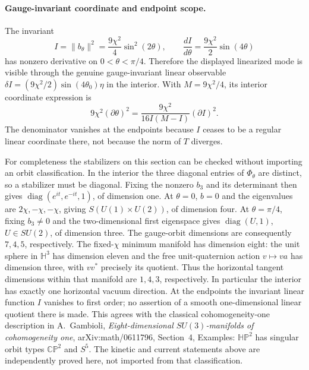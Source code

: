 \paragraph{Gauge-invariant coordinate and endpoint scope.}
The invariant
\[
 I=\|b_\theta\|^2=\frac{9\chi^2}{4}\sin^2(2\theta),\qquad
 \frac{dI}{d\theta}=\frac{9\chi^2}{2}\sin(4\theta)
\]
has nonzero derivative on \(0<\theta<\pi/4\). Therefore the displayed
linearized mode is visible through the genuine gauge-invariant
linear observable
\(\delta I=(9\chi^2/2)\sin(4\theta_0)\eta\) in the interior.
With \(M=9\chi^2/4\), its interior coordinate expression is
\[
 9\chi^2(\partial\theta)^2
       =\frac{9\chi^2}{16I(M-I)}(\partial I)^2 .
\]
The denominator vanishes at the endpoints because \(I\) ceases to be
a regular linear coordinate there, not because the norm of \(T\)
diverges.

For completeness the stabilizers on this section can be checked
without importing an orbit classification. In the interior the
three diagonal entries of \(\Phi_\theta\) are distinct, so a
stabilizer must be diagonal. Fixing the nonzero \(b_3\) and its
determinant then gives
\(\operatorname{diag}(e^{it},e^{-it},1)\), of dimension one.
At \(\theta=0\), \(b=0\) and the eigenvalues are \(2\chi,-\chi,-\chi\),
giving \(S(U(1)\times U(2))\), of dimension four.
At \(\theta=\pi/4\), fixing \(b_3\ne0\) and the two-dimensional
first eigenspace gives \(\operatorname{diag}(U,1)\), \(U\in SU(2)\),
of dimension three. The gauge-orbit dimensions are consequently
\(7,4,5\), respectively. The fixed-\(\chi\) minimum manifold has
dimension eight: the unit sphere in \(\mathbb H^3\) has dimension
eleven and the free unit-quaternion action \(v\mapsto va\) has
dimension three, with \(vv^*\) precisely its quotient.
Thus the horizontal tangent dimensions within that manifold are
\(1,4,3\), respectively. In particular the interior has exactly one
horizontal vacuum direction. At the endpoints the invariant
linear function \(I\) vanishes to first order; no assertion of a
smooth one-dimensional linear quotient there is made.
This agrees with the classical cohomogeneity-one description in
A.~Gambioli, \emph{Eight-dimensional \(SU(3)\)-manifolds of
cohomogeneity one}, arXiv:math/0611796, Section~4, Examples:
\(\mathbb{HP}^2\) has singular orbit types \(\mathbb{CP}^2\) and
\(S^5\). The kinetic and current statements above are independently
proved here, not imported from that classification.

